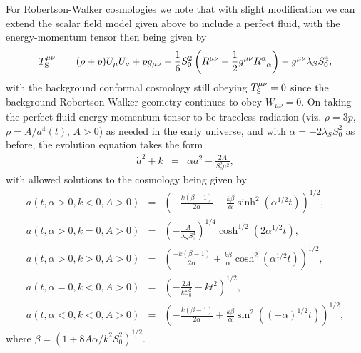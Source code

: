 For Robertson-Walker cosmologies we note that with slight modification we can extend the scalar field model given above to include a perfect fluid, with the energy-momentum tensor then being given by \cite{mannheim_1998}
%                                                                               
\begin{eqnarray}
T_{\rm S}^{\mu \nu}&=&(\rho+p)U_{\mu}U_{\nu}+pg_{\mu\nu} 
-\frac{1}{6} S_0^2\left(R^{\mu\nu}-\frac{1}{2}g^{\mu\nu}
R^\alpha_{\phantom{\alpha}\alpha}\right)-g^{\mu\nu}\lambda_S S_0^4,
\label{A17}
\end{eqnarray}                                 
%
with the background conformal cosmology still obeying $T_{\rm S}^{\mu \nu}=0$ since the background  Robertson-Walker geometry continues to obey $W_{\mu\nu}=0$.  On taking the perfect fluid energy-momentum tensor to be traceless radiation  (viz. $\rho=3p$, $\rho=A/a^4(t)$, $A>0$) as needed in the early universe, and with $\alpha =-2\lambda_{S}S^2_0$ as before, the evolution equation takes the form
%                                                                               
\begin{eqnarray}
\dot{a}^2+k&=&\alpha a^2-\frac{2A}{S_0^2a^2},
\label{A18}
\end{eqnarray}                                 
% 
with allowed solutions to the cosmology being given by  \cite{mannheim_1998} 
%
\begin{eqnarray}
a(t,\alpha>0,k<0,A>0)&=&\left(-\frac{k(\beta-1)}{2\alpha}-\frac{k\beta}{\alpha}\sinh^2(\alpha^{1/2}t)\right)^{1/2},
\nonumber \\
a(t,\alpha>0,k=0,A>0)&=&\left(-\frac{A}{\lambda_S S_0^4}\right)^{1/4}\cosh^{1/2}(2\alpha^{1/2}t),
\nonumber \\
a(t,\alpha>0,k>0,A>0)&=&\left(\frac{-k(\beta-1)}{2\alpha}+\frac{k\beta}{\alpha}\cosh^2(\alpha^{1/2}t)\right)^{1/2},
\nonumber\\
a(t,\alpha=0,k<0,A>0)&=&\left(-\frac{2A}{kS_0^2}-kt^2\right)^{1/2},
\nonumber \\
a(t,\alpha<0,k<0,A>0)&=&\left(-\frac{k(\beta-1)}{2\alpha}+\frac{k\beta}{\alpha}\sin^2((-\alpha)^{1/2}t)\right)^{1/2},
\label{A19}
\end{eqnarray}
%
where $\beta=(1+8A\alpha/k^2S_0^2)^{1/2}$.
